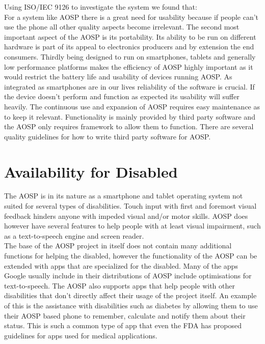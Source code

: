\documentclass[conference]{IEEEtran}
\begin{document}
Using ISO/IEC 9126\cite{jung2004} to investigate the system we found that: \\
For a system like AOSP there is a great need for usability because if people can't use the phone all other quality aspects become irrelevant. The second most important aspect of the AOSP is its portability. Its ability to be run on different hardware is part of its appeal to electronics producers and by extension the end consumers. Thirdly being designed to run on smartphones, tablets and generally low performance platforms makes the efficiency of AOSP highly important as it would restrict the battery life and usability of devices running AOSP. As integrated as smartphones are in our lives reliability of the software is crucial. If the device doesn't perform and function as expected its usability will suffer heavily. The continuous use and expansion of AOSP requires easy maintenance as to keep it relevant. Functionality is mainly provided by third party software and the AOSP only requires framework to allow them to function. There are several quality guidelines for how to write third party software for AOSP.\cite{android-quality}


\section{Availability for Disabled}
\label{availability}


The AOSP is in its nature as a smartphone and tablet operating system not suited for several types of disabilities. Touch input with first and foremost visual feedback hinders anyone with impeded visual and/or motor skills. AOSP does however have several features to help people with at least visual impairment, such as a text-to-speech engine and screen reader.\cite{android-disabled-help} 
\\The base of the AOSP project in itself does not contain many additional functions for helping the disabled, however the functionality of the AOSP can be extended with apps that are specialized for the disabled.\cite{android-disabled-apps} Many of the apps Google usually include in their distributions of AOSP include optimisations for text-to-speech.\cite{android-disabled-help} The AOSP also supports apps that help people with other disabilities that don't directly affect their usage of the project itself. An example of this is the assistance with disabilities such as diabetes by allowing them to use their AOSP based phone to remember, calculate and notify them about their status.\cite{android-disabled-diabetes} This is such a common type of app that even the FDA has proposed guidelines for apps used for medical applications.\cite{android-disabled-FDA}
\end{document}
